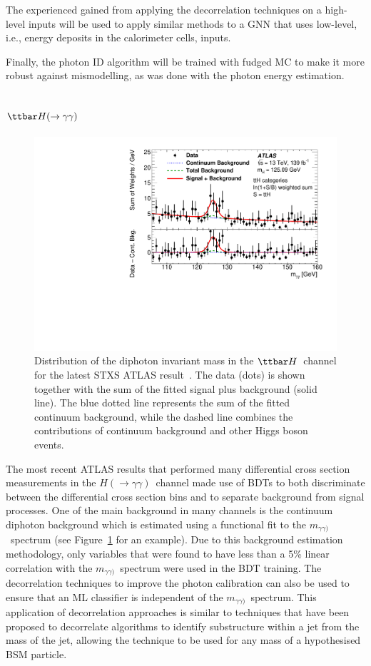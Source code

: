 \documentclass[letter, USenglish, 11pt, subfigure]{article}
\newcommand{\ttH}{\ensuremath{\ttbar H}}
\newcommand{\tthyy}{\ensuremath{\ttbar H(\to\gamma\gamma)}}
\newcommand{\myy}{\ensuremath{m_{\gamma\gamma)}}}
\newcommand{\hyy}{\ensuremath{H(\to\gamma\gamma)}}
\begin{document}
The experienced gained from applying the decorrelation techniques on a high-level inputs will be used to apply similar methods to a GNN that uses low-level, i.e., energy deposits in the calorimeter cells, inputs.

Finally, the photon ID algorithm will be trained with fudged MC to make it more robust against mismodelling, as was done with the photon energy estimation. 

\subsection{\tthyy}
\begin{figure}
  \centering
  \includegraphics[width=\linewidth]{figures/tth_myy.pdf}
  \caption{\label{fig:myy} Distribution of the diphoton invariant mass in the \ttH\ channel for the latest STXS ATLAS result~\cite{ATLAS_STXS}. The data (dots) is shown together with the sum of the fitted signal plus background (solid line). The blue dotted line represents the sum of the fitted continuum background, while the dashed line combines the contributions of continuum background and other Higgs boson events.}
\end{figure}

The most recent ATLAS results that performed many differential cross section measurements in the \hyy\ channel made use of BDTs to both discriminate between the differential cross section bins and to separate background from signal processes. One of the main background in many channels is the continuum diphoton background which is estimated using a functional fit to the \myy\ spectrum (see Figure~\ref{fig:myy} for an example). Due to this background estimation methodology, only variables that were found to have less than a 5\% linear correlation with the \myy\ spectrum were used in the BDT training. The decorrelation techniques to improve the photon calibration can also be used to ensure that an ML classifier is independent of the \myy\ spectrum. This application of decorrelation approaches is similar to techniques that have been proposed to decorrelate algorithms to identify substructure within a jet from the mass of the jet, allowing the technique to be used for any mass of a hypothesised BSM particle.
\end{document}
